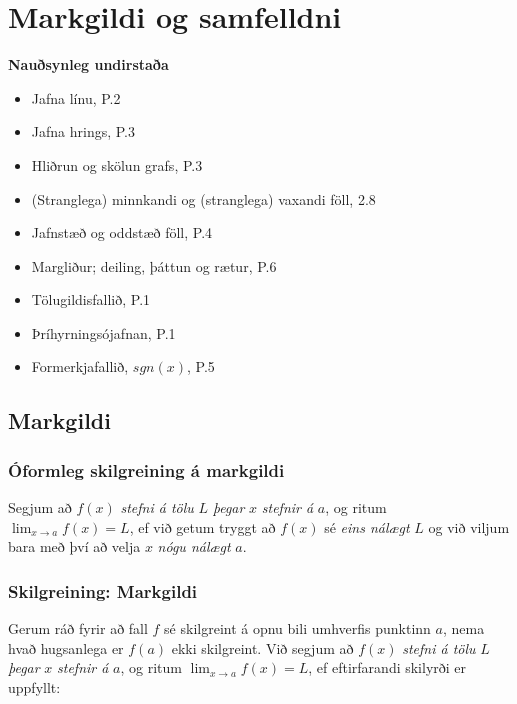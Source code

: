 \documentclass[icelandic,a4paper,12pt]{article}
\date{29. ágúst 2015}
\begin{document}
\setcounter{tocdepth}{2}
\tableofcontents

\section{Markgildi og samfelldni}

\textbf{Nauðsynleg undirstaða}
\begin{itemize}
  \item Jafna línu, P.2
  \item Jafna hrings, P.3
  \item Hliðrun og skölun grafs, P.3
  \item (Stranglega) minnkandi og (stranglega) vaxandi föll, 2.8
  \item Jafnstæð og oddstæð föll, P.4
  \item Margliður; deiling, þáttun og rætur, P.6
  \item Tölugildisfallið, P.1
  \item Þríhyrningsójafnan, P.1
  \item Formerkjafallið, $sgn(x)$, P.5
\end{itemize}

\subsection{Markgildi}
\subsubsection{Óformleg skilgreining á markgildi}  
Segjum að  $f(x)$
\emph{stefni á tölu} $L$ \emph{þegar} $x$ \emph{stefnir á} $a$, og ritum
$\lim_{x\rightarrow a} f(x)=L$, ef við getum tryggt að  $f(x)$ sé \emph{eins nálægt}
$L$ og við viljum bara með því að velja $x$ \emph{nógu nálægt} $a$.  

\pause

\subsubsection{Skilgreining: Markgildi} Gerum ráð fyrir að fall $f$ sé
skilgreint á opnu bili umhverfis punktinn $a$, nema hvað hugsanlega er
$f(a)$ ekki skilgreint. \pause 
Við segjum að $f(x)$
\emph{stefni á tölu} $L$ \emph{þegar} $x$ \emph{stefnir á} $a$, og ritum
$\lim_{x\rightarrow a} f(x)=L$, ef eftirfarandi skilyrði er uppfyllt:
\end{document}
